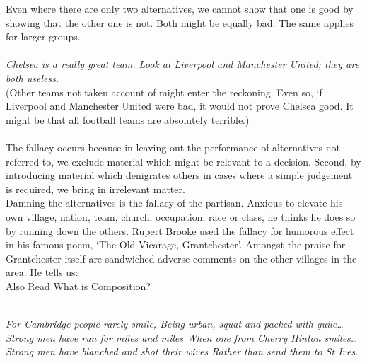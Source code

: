 \documentclass[a4paper,12pt,single,pdftex]{scrartcl}
\begin{document}
    
      Even where there are only two alternatives, we cannot show that one is good by showing that the other one is not. Both might be equally bad. The same applies for larger groups.
    \\

    
       
    \\

    
      {\em Chelsea is a really great team. Look at Liverpool and Manchester United; they are both useless.}
    \\

    
      (Other teams not taken account of might enter the reckoning. Even so, if Liverpool and Manchester United were bad, it would not prove Chelsea good. It might be that all football teams are absolutely terrible.)
    \\

    
       
    \\

    
      The fallacy occurs because in leaving out the performance of alternatives not referred to, we exclude material which might be relevant to a decision. Second, by introducing material which denigrates others in cases where a simple judgement is required, we bring in irrelevant matter.
    \\

    
      Damning the alternatives is the fallacy of the partisan. Anxious to elevate his own village, nation, team, church, occupation, race or class, he thinks he does so by running down the others. Rupert Brooke used the fallacy for humorous effect in his famous poem, ‘The Old Vicarage, Grantchester’. Amongst the praise for Grantchester itself are sandwiched adverse comments on the other villages in the area. He tells us:
    \\

    
      

      
        Also Read  What is Composition?
      
    
    
       
    \\

    
      {\em For Cambridge people rarely smile, \newline
Being urban, squat and packed with guile… \newline
Strong men have run for miles and miles \newline
When one from Cherry Hinton smiles… \newline
Strong men have blanched and shot their wives \newline
Rather than send them to St Ives.}
    \\
\end{document}
